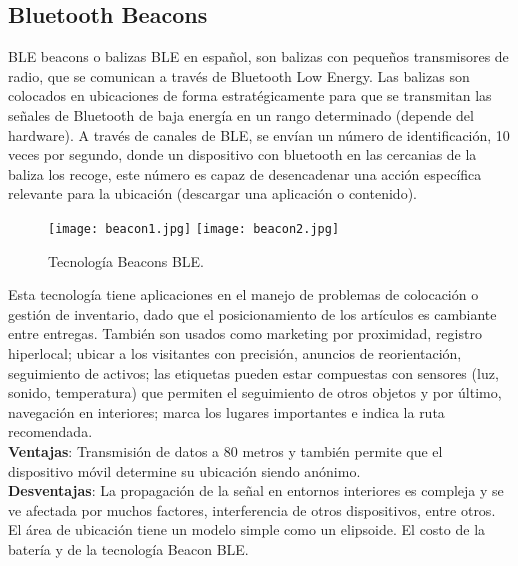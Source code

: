 \subsection{Bluetooth Beacons}
BLE beacons o balizas BLE en español, son balizas con pequeños transmisores de radio, que se comunican a través de Bluetooth Low Energy. Las balizas son colocados en ubicaciones de forma estratégicamente para que se transmitan las señales de Bluetooth de baja energía en un rango determinado (depende del hardware).  A través de canales de BLE, se envían un número de identificación, 10 veces por segundo, donde un dispositivo con bluetooth en las cercanias de la baliza los recoge, este número es capaz de desencadenar una acción específica relevante para la ubicación (descargar una aplicación o contenido). \cite{Adarsh2021} 
\begin{figure} 	
	\texttt{[image: beacon1.jpg]}
	\texttt{[image: beacon2.jpg]}
	\caption{Tecnología Beacons BLE.}
	\label{fig:beacons}
\end{figure}

Esta tecnología tiene aplicaciones en el manejo de problemas de colocación o gestión de inventario, dado que el posicionamiento de los artículos es cambiante entre entregas. \cite{Octaviani2020} También son usados como marketing por proximidad, registro hiperlocal; ubicar a los visitantes con precisión, anuncios de reorientación, seguimiento de activos; las etiquetas pueden estar compuestas con sensores (luz, sonido, temperatura) que permiten el seguimiento de otros objetos y por último, navegación en interiores; marca los lugares importantes e indica la ruta recomendada. \cite{Adarsh2021}
\\
\textbf{Ventajas}: Transmisión de datos a 80 metros y también permite que el dispositivo móvil determine su ubicación siendo anónimo.\cite{Adarsh2021,Chawathe2008} 
\\
\textbf{Desventajas}: La propagación de la señal en entornos interiores es compleja y se ve afectada por muchos factores, interferencia de otros dispositivos, entre otros. El área de ubicación tiene un modelo simple como un elipsoide.\cite{Chawathe2008} El costo de la batería y de la tecnología Beacon BLE.

